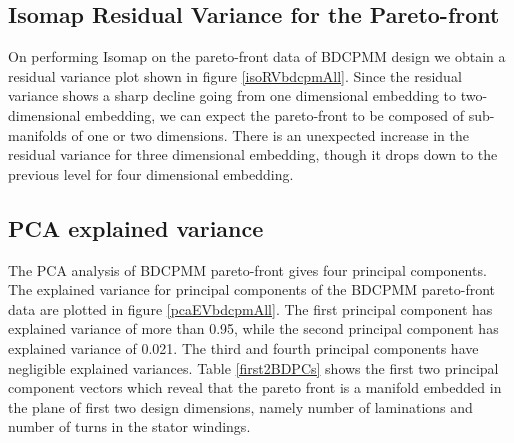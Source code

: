 \subsection{Isomap Residual Variance for the Pareto-front}
On performing Isomap on the pareto-front data of BDCPMM design we obtain a
residual variance plot shown in figure \ref{isoRVbdcpmAll}.  Since the
residual variance shows a sharp decline going from one dimensional
embedding to two-dimensional embedding, we can expect the pareto-front to
be composed of sub-manifolds of one or two dimensions.  There is an
unexpected increase in the residual variance for three dimensional
embedding, though it drops down to the previous level for four dimensional
embedding.

\subsection{PCA explained variance}
The PCA analysis of BDCPMM pareto-front gives four principal
components. The explained variance for principal components of the BDCPMM
pareto-front data are plotted in figure \ref{pcaEVbdcpmAll}.  The first
principal component has explained variance of more than 0.95, while the
second principal component has explained variance of 0.021.  The third and
fourth principal components have negligible explained variances. Table
\ref{first2BDPCs} shows the first two principal component vectors which
reveal that the pareto front is a manifold embedded in the plane of first
two design dimensions, namely number of laminations and number of turns in
the stator windings.
 


